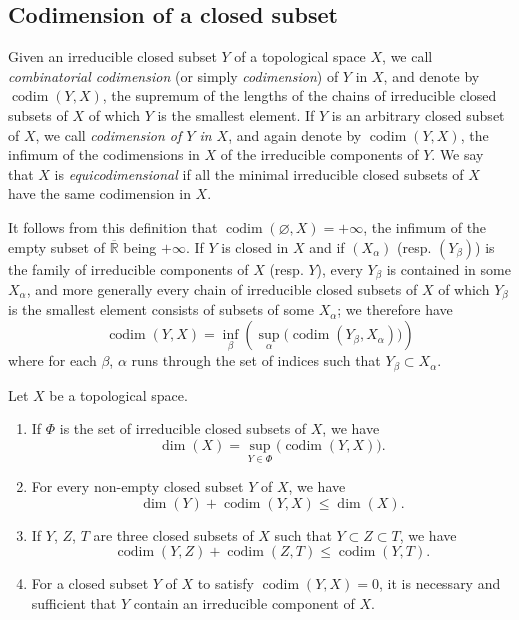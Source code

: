 \subsection{Codimension of a closed subset}
\label{subsection:0.14.2}

\begin{definition}[14.2.1]
\label{0.14.2.1}
Given an irreducible closed subset $Y$ of a topological space $X$,
we call \emph{combinatorial codimension} (or simply \emph{codimension})
of $Y$ in $X$, and denote by $\operatorname{codim}(Y,X)$, the supremum
of the lengths of the chains of irreducible closed subsets of $X$ of which $Y$
is the smallest element. If $Y$ is an arbitrary closed subset of $X$, we
call \emph{codimension of $Y$ in $X$}, and again denote by
$\operatorname{codim}(Y,X)$, the infimum of the codimensions in $X$ of the
irreducible components of $Y$. We say that $X$ is
\emph{equicodimensional} if all the minimal irreducible closed subsets
of $X$ have the same codimension in $X$.
\end{definition}

It follows from this definition that
$\operatorname{codim}(\varnothing,X)=+\infty$, the infimum of the
empty subset of $\overline{\mathbb R}$ being $+\infty$. If $Y$ is closed in
$X$ and if $(X_\alpha)$ (resp. $(Y_\beta)$) is the family of irreducible
components of $X$ (resp. $Y$), every $Y_\beta$ is contained in some
$X_\alpha$, and more generally every chain of irreducible closed
subsets of $X$ of which $Y_\beta$ is the smallest element consists of
subsets of some $X_\alpha$; we therefore have
\[
  \operatorname{codim}(Y,X)=
  \inf_\beta\left(\sup_\alpha
  \bigl(\operatorname{codim}(Y_\beta,X_\alpha)\bigr)\right)
  \tag{14.2.1.1}\label{0.14.2.1.1}
\]
where for each $\beta$, $\alpha$ runs through the set of indices such that
$Y_\beta\subset X_\alpha$.

\begin{proposition}[14.2.2]
\label{0.14.2.2}
Let $X$ be a topological space.
\begin{enumerate}
  \item[\rm(i)] If $\Phi$ is the set of irreducible closed subsets of
  $X$, we have
  \[
    \dim(X)=\sup_{Y\in\Phi}\bigl(\operatorname{codim}(Y,X)\bigr).
    \tag{14.2.2.1}\label{0.14.2.2.1}
  \]
  \item[\rm(ii)] For every non-empty closed subset $Y$ of $X$, we have
  \[
    \dim(Y)+\operatorname{codim}(Y,X)\leq\dim(X).
    \tag{14.2.2.2}\label{0.14.2.2.2}
  \]
  \item[\rm(iii)] If $Y$, $Z$, $T$ are three closed subsets of $X$ such
  that $Y\subset Z\subset T$, we have
  \[
    \operatorname{codim}(Y,Z)+\operatorname{codim}(Z,T)
    \leq\operatorname{codim}(Y,T).
    \tag{14.2.2.3}\label{0.14.2.2.3}
  \]
  \item[\rm(iv)] For a closed subset $Y$ of $X$ to satisfy
  $\operatorname{codim}(Y,X)=0$, it is necessary and sufficient that $Y$ contain an
  irreducible component of $X$.
\end{enumerate}
\end{proposition}

